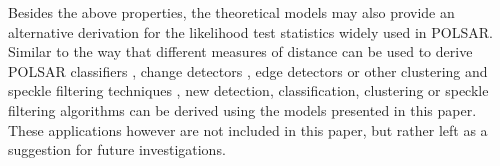 \documentclass[journal]{IEEEtran}
\begin{document}
Besides the above properties, the theoretical models may also provide an alternative derivation for the likelihood test statistics widely used in POLSAR.
Similar to the way that different measures of distance can be used to derive POLSAR classifiers \cite{Lee_1999_TGRS}, change detectors \cite{Conradsen_2003_TGRS_4}, edge detectors \cite{Schou_2003_TGRS_20} or other clustering and speckle filtering techniques \cite{Le_2010_ACRS} \cite{Le_2011_ACRS}, 
new detection, classification, clustering or speckle filtering algorithms can be derived using the models presented in this paper.
These applications however are not included in this paper, but rather left as a suggestion for future investigations.

%
\end{document}
